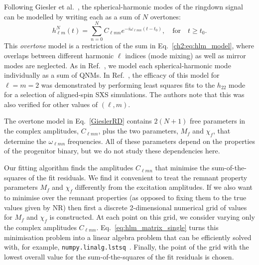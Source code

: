 Following Giesler et al.~\cite{Giesler:2019uxc}, the spherical-harmonic modes of the ringdown signal can be modelled by writing each as a sum of $N$ overtones:
\begin{equation}\label{GieslerRD}
    h_{\ell m}^N(t) = \sum_{n=0}^N C_{\ell m n} e^{-i\omega_{\ell m n}(t-t_0)}, \quad \textrm{for} \quad t \geq t_0.
\end{equation}
This \emph{overtone} model is a restriction of the sum in Eq.~\ref{ch2:eq:hlm_model}, where overlaps between different harmonic $\ell$ indices (mode mixing) as well as mirror modes are neglected. 
As in Ref.~\cite{Giesler:2019uxc}, we model each spherical-harmonic mode individually as a sum of QNMs.
In Ref.~\cite{Giesler:2019uxc}, the efficacy of this model for $\ell=m=2$ was demonstrated by performing least squares fits to the $h_{22}$ mode for a selection of aligned-spin SXS simulations. The authors note that this was also verified for other values of $(\ell,m)$.

The overtone model in Eq.~\ref{GieslerRD} contains $2(N+1)$ free parameters in the complex amplitudes, $C_{\ell m n}$, plus the two parameters, $M_f$ and $\chi_f$, that determine the $\omega_{\ell m n}$ frequencies.
All of these parameters depend on the properties of the progenitor binary, but we do not study these dependencies here.

Our fitting algorithm finds the amplitudes $C_{\ell m n}$ that minimise the sum-of-the-squares of the fit residuals.
We find it convenient to treat the remnant property parameters $M_f$ and $\chi_f$ differently from the excitation amplitudes. 
If we also want to minimise over the remnant properties (as opposed to fixing them to the true values given by NR) then first a discrete 2-dimensional numerical grid of values for $M_f$ and $\chi_f$ is constructed.
At each point on this grid, we consider varying only the complex amplitudes $C_{\ell m n}$. 
Eq.~\ref{eq:hlm_matrix_single} turns this minimisation problem into a linear algebra problem that can be efficiently solved with, for example, \texttt{numpy.linalg.lstsq}~\cite{Harris:2020xlr}.
Finally, the point of the grid with the lowest overall value for the sum-of-the-squares of the fit residuals is chosen.

